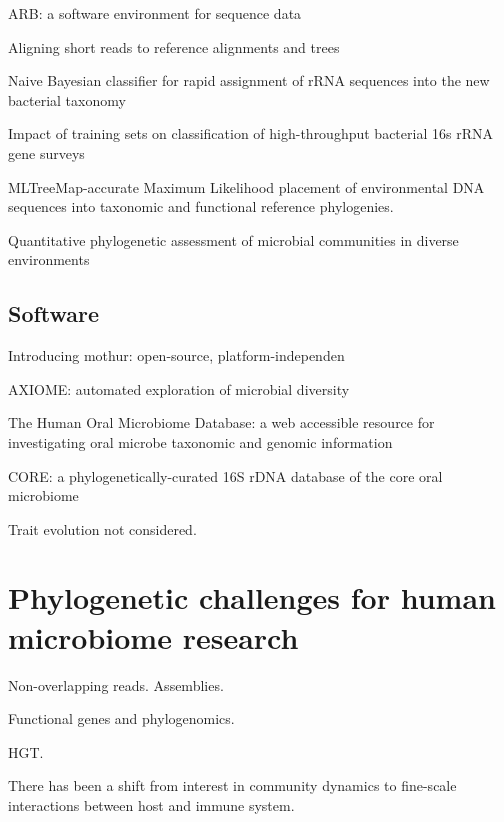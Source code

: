 \documentclass{amsart}
\begin{document}
\cite{matsen2010pplacer}

\cite{ludwig2004arb}
{{ARB}: a software environment for sequence data}
\cite{berger2011performance}

\cite{berger2011aligning}
Aligning short reads to reference alignments and trees


\cite{wang2007naive}
{Naive Bayesian classifier for rapid assignment of rRNA sequences into the new bacterial taxonomy}

\cite{werner2011impact}
Impact of training sets on classification of high-throughput bacterial 16s rRNA gene surveys


\cite{stark2010mltreemap}
{{MLTreeMap}-accurate Maximum Likelihood placement of environmental DNA sequences into taxonomic and functional reference phylogenies.}

\cite{vonMeringEaQuantitative08}
{Quantitative phylogenetic assessment of microbial communities in diverse environments}

\subsection{Software}
\cite{caporaso2010qiime}

\cite{schloss2009introducing}
Introducing mothur: open-source, platform-independen

\cite{lynch2013axiome}
AXIOME: automated exploration of microbial diversity

\cite{chen2010human}
The Human Oral Microbiome Database: a web accessible resource for investigating oral microbe taxonomic and genomic information

\cite{griffen2011core}
CORE: a phylogenetically-curated 16S rDNA database of the core oral microbiome

\cite{srinivasan2012bacterial}

Trait evolution not considered.


\section{Phylogenetic challenges for human microbiome research}

Non-overlapping reads.
Assemblies.

Functional genes and phylogenomics.

HGT.

There has been a shift from interest in community dynamics to fine-scale interactions between host and immune system.
\end{document}

